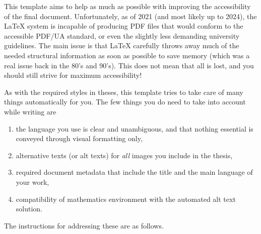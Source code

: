This template aims to help as much as possible with improving the accessibility of the final document. Unfortunately, as of 2021 (and most likely up to 2024), the \LaTeX{} system is incapable of producing PDF files that would conform to the accessible PDF/UA standard, or even the slightly less demanding university guidelines. The main issue is that \LaTeX{} carefully throws away much of the needed structural information as soon as possible to save memory (which was a real issue back in the 80's and 90's). This does not mean that all is lost, and you should still strive for maximum accessibility!

As with the required styles in theses, this template tries to take care of many things automatically for you. The few things you do need to take into account while writing are
\begin{enumerate}
\item the language you use is clear and unambiguous, and that nothing essential is conveyed through visual formatting only,
\item alternative texts (or alt texts) for \emph{all} images you include in the thesis,
\item required document metadata that include the title and the main language of your work,
\item compatibility of mathematics environment with the automated alt text solution.
\end{enumerate}
The instructions for addressing these are as follows.
